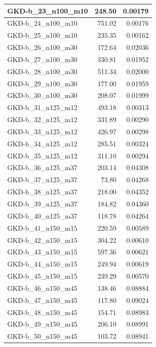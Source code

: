 \documentclass{article}
\begin{document}
\begin{table}[ht]
\begin{tabular}{|l|r|r|}
GKD-b\_23\_n100\_m10 & 248.50 & 0.00179 \\ \hline
GKD-b\_24\_n100\_m10 & 751.02 & 0.00176 \\ \hline
GKD-b\_25\_n100\_m10 & 235.35 & 0.00162 \\ \hline
GKD-b\_26\_n100\_m30 & 172.64 & 0.02036 \\ \hline
GKD-b\_27\_n100\_m30 & 330.81 & 0.01952 \\ \hline
GKD-b\_28\_n100\_m30 & 511.34 & 0.02000 \\ \hline
GKD-b\_29\_n100\_m30 & 177.00 & 0.01959 \\ \hline
GKD-b\_30\_n100\_m30 & 208.07 & 0.01999 \\ \hline
GKD-b\_31\_n125\_m12 & 493.18 & 0.00313 \\ \hline
GKD-b\_32\_n125\_m12 & 331.89 & 0.00290 \\ \hline
GKD-b\_33\_n125\_m12 & 426.97 & 0.00298 \\ \hline
GKD-b\_34\_n125\_m12 & 285.51 & 0.00324 \\ \hline
GKD-b\_35\_n125\_m12 & 311.10 & 0.00294 \\ \hline
GKD-b\_36\_n125\_m37 & 203.14 & 0.04308 \\ \hline
GKD-b\_37\_n125\_m37 & 73.80 & 0.04268 \\ \hline
GKD-b\_38\_n125\_m37 & 218.00 & 0.04352 \\ \hline
GKD-b\_39\_n125\_m37 & 184.82 & 0.04360 \\ \hline
GKD-b\_40\_n125\_m37 & 118.78 & 0.04264 \\ \hline
GKD-b\_41\_n150\_m15 & 220.59 & 0.00589 \\ \hline
GKD-b\_42\_n150\_m15 & 304.22 & 0.00610 \\ \hline
GKD-b\_43\_n150\_m15 & 597.36 & 0.00621 \\ \hline
GKD-b\_44\_n150\_m15 & 249.94 & 0.00619 \\ \hline
GKD-b\_45\_n150\_m15 & 239.29 & 0.00570 \\ \hline
GKD-b\_46\_n150\_m45 & 138.46 & 0.08884 \\ \hline
GKD-b\_47\_n150\_m45 & 117.80 & 0.09024 \\ \hline
GKD-b\_48\_n150\_m45 & 154.71 & 0.08983 \\ \hline
GKD-b\_49\_n150\_m45 & 206.10 & 0.08991 \\ \hline
GKD-b\_50\_n150\_m45 & 103.72 & 0.08941 \\ \hline
\end{tabular}
\end{table}
\end{document}
